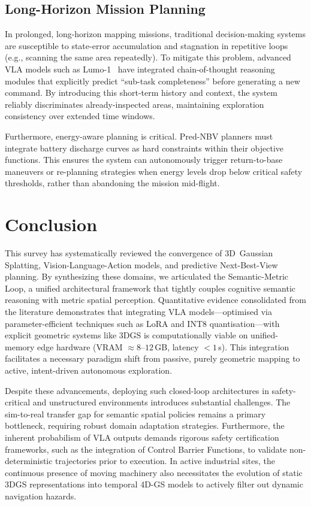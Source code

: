 \documentclass[conference]{IEEEtran}
\begin{document}
\subsection{Long-Horizon Mission Planning}
\label{subsec:disc_longhorizon}

In prolonged, long-horizon mapping missions, traditional decision-making systems are susceptible to state-error accumulation and stagnation in repetitive loops (e.g., scanning the same area repeatedly).
To mitigate this problem, advanced VLA models such as Lumo-1~\cite{astribot2025lumo} have integrated chain-of-thought reasoning modules that explicitly predict ``sub-task completeness'' before generating a new command.
By introducing this short-term history and context, the system reliably discriminates already-inspected areas, maintaining exploration consistency over extended time windows.

Furthermore, energy-aware planning is critical. Pred-NBV planners must integrate battery discharge curves as hard constraints within their objective functions. This ensures the system can autonomously trigger return-to-base maneuvers or re-planning strategies when energy levels drop below critical safety thresholds, rather than abandoning the mission mid-flight.

\section{Conclusion}
\label{sec:conclusion}

This survey has systematically reviewed the convergence of 3D~Gaussian Splatting, Vision-Language-Action models, and predictive Next-Best-View planning. By synthesizing these domains, we articulated the Semantic-Metric Loop, a unified architectural framework that tightly couples cognitive semantic reasoning with metric spatial perception. Quantitative evidence consolidated from the literature demonstrates that integrating VLA models---optimised via parameter-efficient techniques such as LoRA and INT8 quantisation---with explicit geometric systems like 3DGS is computationally viable on unified-memory edge hardware (VRAM $\approx 8$--$12$\,GB, latency $< 1$\,s). This integration facilitates a necessary paradigm shift from passive, purely geometric mapping to active, intent-driven autonomous exploration.

Despite these advancements, deploying such closed-loop architectures in safety-critical and unstructured environments introduces substantial challenges. The sim-to-real transfer gap for semantic spatial policies remains a primary bottleneck, requiring robust domain adaptation strategies. Furthermore, the inherent probabilism of VLA outputs demands rigorous safety certification frameworks, such as the integration of Control Barrier Functions, to validate non-deterministic trajectories prior to execution. In active industrial sites, the continuous presence of moving machinery also necessitates the evolution of static 3DGS representations into temporal 4D-GS models to actively filter out dynamic navigation hazards.
\end{document}
